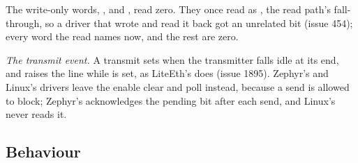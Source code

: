 The write-only words, ,  and
, read zero. They once
read as , the read path's fall-through, so a
driver that wrote  and read it back got an unrelated
bit (issue 454); every word the read names now, and the rest are
zero.

\emph{The transmit event.} A transmit sets 
when the transmitter falls idle at its end, and raises the line while
 is set, as LiteEth's does (issue 1895). Zephyr's
and Linux's drivers leave the enable clear and poll 
instead, because a send is allowed to block; Zephyr's acknowledges the
pending bit after each send, and Linux's never reads it.


\subsection*{Behaviour}

